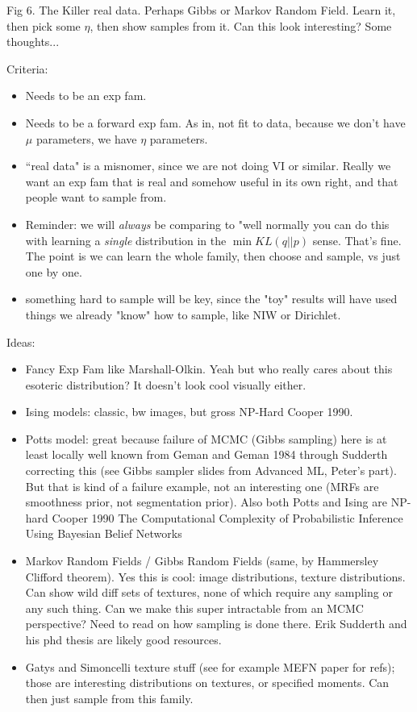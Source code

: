 \documentclass{article}
\begin{document}
Fig 6. The Killer real data.  Perhaps Gibbs or Markov Random Field.  Learn it, then pick some $\eta$, then show samples from it.  Can this look interesting?  Some thoughts...
 
 Criteria:
 \begin{itemize}
\item Needs to be an exp fam.
\item Needs to be a forward exp fam.  As in, not fit to data, because we don't have $\mu$ parameters, we have $\eta$ parameters.
\item ``real data" is a misnomer, since we are not doing VI or similar.  Really we want an exp fam that is real and somehow useful in its own right, and that people want to sample from.
\item Reminder: we will \emph{always} be comparing to "well normally you can do this with learning a \emph{single} distribution in the $\min KL(q||p)$ sense.  That's fine.  The point is we can learn the whole family, then choose and sample, vs just one by one.
\item something hard to sample will be key, since the "toy" results will have used things we already "know" how to sample, like NIW or Dirichlet.
 \end{itemize} 

Ideas: 
\begin{itemize}
\item Fancy Exp Fam like Marshall-Olkin.  Yeah but who really cares about this esoteric distribution?  It doesn't look cool visually either.
\item Ising models: classic, bw images, but gross NP-Hard Cooper 1990.
\item Potts model: great because failure of MCMC (Gibbs sampling) here is at least locally well known from Geman and Geman 1984 through Sudderth correcting this (see Gibbs sampler slides from Advanced ML, Peter's part).  But that is kind of a failure example, not an interesting one (MRFs are smoothness prior, not segmentation prior).	Also both Potts and Ising are NP-hard Cooper 1990 The Computational Complexity of
Probabilistic Inference Using Bayesian
Belief Networks 
\item Markov Random Fields / Gibbs Random Fields (same, by Hammersley Clifford theorem).  Yes this is cool: image distributions, texture distributions.  Can show wild diff sets of textures, none of which require any sampling or any such thing.  Can we make this super intractable from an MCMC perspective?  Need to read on how sampling is done there.  Erik Sudderth and his phd thesis are likely good resources.
\item Gatys and Simoncelli texture stuff (see for example MEFN paper for refs); those are interesting distributions on textures, or specified moments.  Can then just sample from this family.
\end{itemize}  
\end{document}

